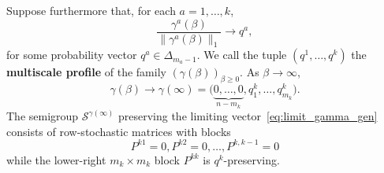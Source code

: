 \documentclass[11pt,a4paper,longbibliography]{amsart}
\numberwithin{equation}{section}
\theoremstyle{plain}
\theoremstyle{definition}
\theoremstyle{remark}
\begin{document}
	
	Suppose furthermore that, for each $a=1,\ldots,k$,
	$$
	\frac{\gamma^a(\beta)}
	{\|\gamma^a(\beta)\|_1}
	\longrightarrow
	q^a,
	$$
	for some probability vector $q^a\in\Delta_{m_a-1}$.
	We call the tuple $(q^1,\ldots,q^k)$ 
	the \textbf{multiscale profile} of the family $\left(\gamma(\beta)\right)_{\beta\geq0}$. As $\beta\to\infty$, 
	\begin{equation}
		\label{eq:limit_gamma_gen}
		\gamma(\beta)
		\to
		\gamma(\infty)
		=
		\big(
		\underbrace{0,\ldots,0}_{n-m_k},
		q^{k}_1,\ldots,q^{k}_{m_k}
		\big).
	\end{equation}
	The semigroup $\mathcal{S}^{\gamma(\infty)}$ preserving the limiting  vector~\eqref{eq:limit_gamma_gen}
	consists of row-stochastic matrices with blocks
	\begin{equation}
		P^{k1}=0, P^{k2}=0,\ldots,  P^{k,{k-1}}=0  
	\end{equation}
	while the lower-right $m_k\times m_k$ block $P^{kk}$ is $q^k$-preserving.
\end{document}
